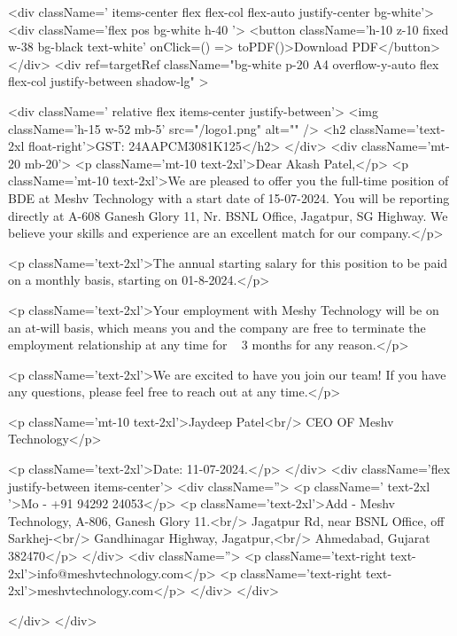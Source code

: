 <div   className='   items-center flex flex-col flex-auto justify-center  bg-white'>
<div className='flex pos bg-white  h-40 '>
<button className='h-10 z-10 fixed  w-38 bg-black text-white' onClick={() => toPDF()}>Download PDF</button>
</div>
<div ref={targetRef} className="bg-white p-20 A4 overflow-y-auto flex flex-col  justify-between shadow-lg" >

<div className=' relative flex items-center  justify-between'>
<img className='h-15 w-52 mb-5' src="/logo1.png" alt="" />
<h2 className='text-2xl float-right'>GST: 24AAPCM3081K125</h2>
</div>
<div className='mt-20 mb-20'>
<p className='mt-10 text-2xl'>Dear Akash Patel,</p>
<p className='mt-10 text-2xl'>We are pleased to offer you the full-time position of BDE at Meshv Technology with a start date of 15-07-2024. You will be reporting directly at A-608 Ganesh Glory 11, Nr. BSNL Office, Jagatpur, SG Highway. We believe your skills and experience are an excellent match for our company.</p>

<p className='text-2xl'>The annual starting salary for this position to be paid on a monthly basis, starting on 01-8-2024.</p>

<p className='text-2xl'>Your employment with Meshy Technology will be on an at-will basis, which means you and the company are free to terminate the employment relationship at any time for   
3 months for any reason.</p>

<p className='text-2xl'>We are excited to have you join our team! If you have any questions, please feel free to reach out at any time.</p>

<p className='mt-10 text-2xl'>Jaydeep Patel<br/>
CEO OF Meshv Technology</p>

<p className='text-2xl'>Date: 11-07-2024.</p>
</div>
<div className='flex  justify-between  items-center'>
<div className=''>
 <p className=' text-2xl '>Mo - +91 94292 24053</p>
 <p className='text-2xl'>Add - Meshv Technology, A-806, Ganesh Glory 11.<br/>
Jagatpur Rd, near BSNL Office, off Sarkhej-<br/>
Gandhinagar Highway, Jagatpur,<br/>
 Ahmedabad, Gujarat 382470</p>
</div>
 <div className=''>
<p className='text-right text-2xl'>info@meshvtechnology.com</p>
<p className='text-right text-2xl'>meshvtechnology.com</p>
 </div>
</div>

</div>
</div>